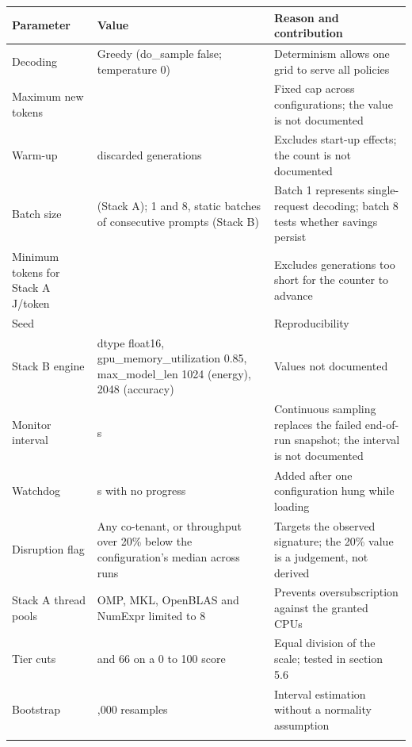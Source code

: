 \begingroup\footnotesize\setlength{\tabcolsep}{4pt}
\begin{longtable}{>{\raggedright\arraybackslash}p{32.8mm}>{\raggedright\arraybackslash}p{50.3mm}>{\raggedright\arraybackslash}p{58.6mm}}
\toprule
\textbf{Parameter} & \textbf{Value} & \textbf{Reason and contribution} \\
\midrule
\endhead
Decoding & Greedy (do\_\allowbreak{}sample false; temperature 0) & Determinism allows one grid to serve all policies \\*
Maximum new tokens & 128 & Fixed cap across configurations; the value is not documented \\
Warm-up & 5 discarded generations & Excludes start-up effects; the count is not documented \\
Batch size & 1 (Stack A); 1 and 8, static batches of consecutive prompts (Stack B) & Batch 1 represents single-request decoding; batch 8 tests whether savings persist \\
Minimum tokens for Stack A J/token & 16 & Excludes generations too short for the counter to advance \\
Seed & 42 & Reproducibility \\
Stack B engine & dtype float16, gpu\_\allowbreak{}memory\_\allowbreak{}utilization 0.85, max\_\allowbreak{}model\_\allowbreak{}len 1024 (energy), 2048 (accuracy) & Values not documented \\
Monitor interval & 2 s & Continuous sampling replaces the failed end-of-run snapshot; the interval is not documented \\
Watchdog & 900 s with no progress & Added after one configuration hung while loading \\
Disruption flag & Any co-tenant, or throughput over 20\% below the configuration's median across runs & Targets the observed signature; the 20\% value is a judgement, not derived \\
Stack A thread pools & OMP, MKL, OpenBLAS and NumExpr limited to 8 & Prevents oversubscription against the granted CPUs \\*
Tier cuts & 33 and 66 on a 0 to 100 score & Equal division of the scale; tested in section 5.6 \\*
Bootstrap & 2,000 resamples & Interval estimation without a normality assumption \\*
\bottomrule\noalign{\nobreak}
\end{longtable}
\addtocounter{table}{-1}
\endgroup


